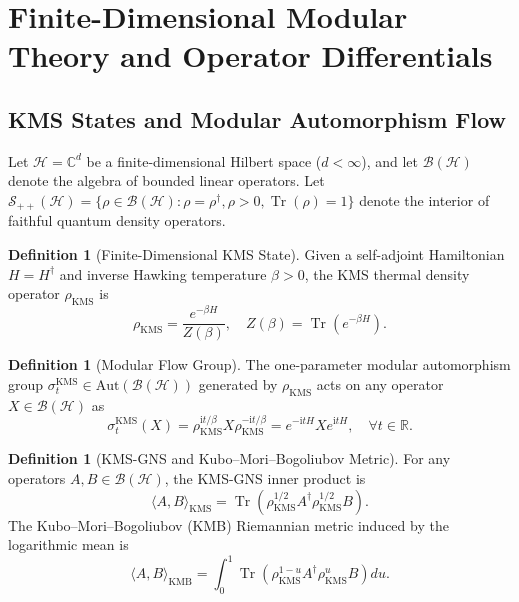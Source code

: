 \documentclass[11pt,a4paper]{article}
\theoremstyle{plain}
\theoremstyle{definition}
\newtheorem{definition}[theorem]{Definition}
\DeclareMathOperator{\Tr}{Tr}
\newcommand{\KMS}{\mathrm{KMS}}
\begin{document}
\section{Finite-Dimensional Modular Theory and Operator Differentials}

\subsection{KMS States and Modular Automorphism Flow}
Let $\mathcal{H} = \mathbb{C}^d$ be a finite-dimensional Hilbert space ($d < \infty$), and let $\mathcal{B}(\mathcal{H})$ denote the algebra of bounded linear operators. Let $\mathcal{S}_{++}(\mathcal{H}) = \{\rho \in \mathcal{B}(\mathcal{H}) : \rho = \rho^\dagger, \rho > 0, \Tr(\rho) = 1\}$ denote the interior of faithful quantum density operators.

\begin{definition}[Finite-Dimensional KMS State]
Given a self-adjoint Hamiltonian $H = H^\dagger$ and inverse Hawking temperature $\beta > 0$, the KMS thermal density operator $\rho_{\KMS}$ is
\begin{equation}
\rho_{\KMS} = \frac{e^{-\beta H}}{Z(\beta)}, \quad Z(\beta) = \Tr(e^{-\beta H}).
\end{equation}
\end{definition}

\begin{definition}[Modular Flow Group]
The one-parameter modular automorphism group $\sigma_t^{\KMS} \in \mathrm{Aut}(\mathcal{B}(\mathcal{H}))$ generated by $\rho_{\KMS}$ acts on any operator $X \in \mathcal{B}(\mathcal{H})$ as
\begin{equation}
\sigma_t^{\KMS}(X) = \rho_{\KMS}^{\mathrm{i}t/\beta} X \rho_{\KMS}^{-\mathrm{i}t/\beta} = e^{-\mathrm{i}t H} X e^{\mathrm{i}t H}, \quad \forall t \in \mathbb{R}.
\end{equation}
\end{definition}

\begin{definition}[KMS-GNS and Kubo--Mori--Bogoliubov Metric]
For any operators $A, B \in \mathcal{B}(\mathcal{H})$, the KMS-GNS inner product is
\begin{equation}
\langle A, B \rangle_{\KMS} = \Tr\left( \rho_{\KMS}^{1/2} A^\dagger \rho_{\KMS}^{1/2} B \right).
\end{equation}
The Kubo--Mori--Bogoliubov (KMB) Riemannian metric induced by the logarithmic mean is
\begin{equation}
\langle A, B \rangle_{\mathrm{KMB}} = \int_0^1 \Tr\left( \rho_{\KMS}^{1-u} A^\dagger \rho_{\KMS}^u B \right) du.
\label{eq:kmb_integral_def}
\end{equation}
\end{definition}
\end{document}
